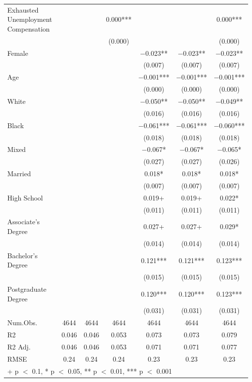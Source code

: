 \documentclass[
]{article}
\begin{document}
\begin{table}
{\begin{tabular}[t]{lcccccc}
Exhausted
Unemployment
Compensation &  &  & \num{0.000}*** &  &  & \num{0.000}***\\
 &  &  & (\num{0.000}) &  &  & (\num{0.000})\\
Female &  &  &  & \num{-0.023}** & \num{-0.023}** & \num{-0.023}**\\
 &  &  &  & (\num{0.007}) & (\num{0.007}) & \vphantom{1} (\num{0.007})\\
Age &  &  &  & \num{-0.001}*** & \num{-0.001}*** & \num{-0.001}***\\
 &  &  &  & (\num{0.000}) & (\num{0.000}) & (\num{0.000})\\
White &  &  &  & \num{-0.050}** & \num{-0.050}** & \num{-0.049}**\\
 &  &  &  & (\num{0.016}) & (\num{0.016}) & (\num{0.016})\\
Black &  &  &  & \num{-0.061}*** & \num{-0.061}*** & \num{-0.060}***\\
 &  &  &  & (\num{0.018}) & (\num{0.018}) & (\num{0.018})\\
Mixed &  &  &  & \num{-0.067}* & \num{-0.067}* & \num{-0.065}*\\
 &  &  &  & (\num{0.027}) & (\num{0.027}) & (\num{0.026})\\
Married &  &  &  & \num{0.018}* & \num{0.018}* & \num{0.018}*\\
 &  &  &  & (\num{0.007}) & (\num{0.007}) & (\num{0.007})\\
High
School &  &  &  & \num{0.019}+ & \num{0.019}+ & \num{0.022}*\\
 &  &  &  & (\num{0.011}) & (\num{0.011}) & (\num{0.011})\\
Associate's
Degree &  &  &  & \num{0.027}+ & \num{0.027}+ & \num{0.029}*\\
 &  &  &  & (\num{0.014}) & (\num{0.014}) & (\num{0.014})\\
Bachelor's
Degree &  &  &  & \num{0.121}*** & \num{0.121}*** & \num{0.123}***\\
 &  &  &  & (\num{0.015}) & (\num{0.015}) & (\num{0.015})\\
Postgraduate
Degree &  &  &  & \num{0.120}*** & \num{0.120}*** & \num{0.123}***\\
 &  &  &  & (\num{0.031}) & (\num{0.031}) & (\num{0.031})\\
\midrule
Num.Obs. & \num{4644} & \num{4644} & \num{4644} & \num{4644} & \num{4644} & \num{4644}\\
R2 & \num{0.046} & \num{0.046} & \num{0.053} & \num{0.073} & \num{0.073} & \num{0.079}\\
R2 Adj. & \num{0.046} & \num{0.046} & \num{0.053} & \num{0.071} & \num{0.071} & \num{0.077}\\
RMSE & \num{0.24} & \num{0.24} & \num{0.24} & \num{0.23} & \num{0.23} & \num{0.23}\\
\bottomrule
\multicolumn{7}{l}{\rule{0pt}{1em}+ p $<$ 0.1, * p $<$ 0.05, ** p $<$ 0.01, *** p $<$ 0.001}\\
\end{tabular}}
\end{table}
\end{document}
